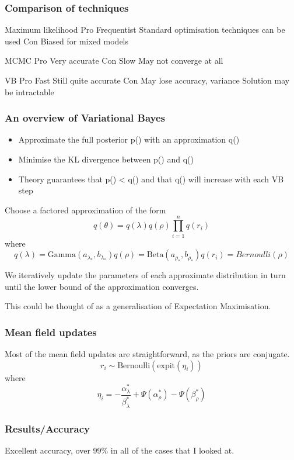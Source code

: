 \documentclass{beamer}
\begin{document}
\begin{frame}
\frametitle{Comparison of techniques}
Maximum likelihood
Pro
Frequentist
Standard optimisation techniques can be used
Con
Biased for mixed models

MCMC
Pro
Very accurate
Con
Slow
May not converge at all

VB
Pro
Fast
Still quite accurate
Con
May lose accuracy, variance
Solution may be intractable
\end{frame}

\begin{frame}
\frametitle{An overview of Variational Bayes}
\begin{itemize}
\item Approximate the full posterior p(\theta) with an approximation q(\theta)
\item Minimise the KL divergence between p(\theta) and q(\theta)
\item Theory guarantees that p(\theta) < q(\theta) and that q(\theta) will
increase with each VB step
\end{itemize}
\end{frame}

\begin{frame}
Choose a factored approximation of the form
$$
q(\theta) = q(\lambda) q(\rho) \prod_{i=1}^n q(r_i)
$$
where
$$
q(\lambda) = \text{Gamma}(a_\lambda_*, b_\lambda_*)
q(\rho) = \text{Beta}(a_\rho_*, b_\rho_*)
q(r_i) = Bernoulli(\rho)
$$

We iteratively update the parameters of each approximate distribution
in turn until the lower bound of the approximation converges.

This could be thought of as a generalisation of Expectation Maximisation.
\end{frame}

\begin{frame}
\frametitle{Mean field updates}
Most of the mean field updates are straightforward, as the priors are conjugate.
$$
r_i \sim \text{Bernoulli}(\text{expit}(\eta_i))
$$
where
$$
\eta_i = - \frac{\alpha_\lambda^*}{\beta_\lambda^*} + \Psi(\alpha_\rho^*) - \Psi(\beta_\rho^*)
$$
\end{frame}

\begin{frame}
\frametitle{Results/Accuracy}
Excellent accuracy, over 99\% in all of the cases that I looked at.
\end{frame}
\end{document}
